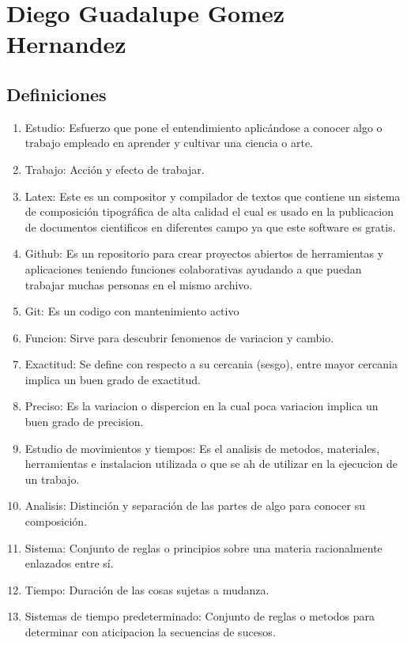 \section{Diego Guadalupe Gomez Hernandez}
\subsection{Definiciones}
\begin{enumerate}
    \item Estudio: Esfuerzo que pone el entendimiento aplicándose a conocer algo o   trabajo empleado en aprender y cultivar una ciencia o arte.
    \item Trabajo: Acción y efecto de trabajar.
    \item Latex: Este es un compositor y compilador de textos que contiene un sistema de composición tipográfica de alta calidad el cual es usado en la publicacion de documentos cientificos en diferentes campo ya que este software es gratis.
    \cite{brys2019tesis}
    \item Github: Es un repositorio  para crear proyectos abiertos de herramientas y aplicaciones teniendo funciones colaborativas ayudando a que puedan trabajar muchas personas en el mismo archivo. 
    \cite{yúbalfernández_2019}
    \item Git: Es un codigo con mantenimiento activo
    \cite{astigarraga2022se}
    \item Funcion: Sirve para descubrir fenomenos de variacion y cambio.
    \item Exactitud: Se define con respecto a su cercania (sesgo), entre mayor cercania implica un buen grado de exactitud.  
    \item Preciso: Es la variacion o dispercion en la cual poca variacion implica un buen grado de precision.
    \item Estudio de movimientos y tiempos: Es el analisis de metodos, materiales, herramientas e instalacion utilizada o que se ah de utilizar en la ejecucion de un trabajo.
    \item Analisis: Distinción y separación de las partes de algo para conocer su composición.
    \cite{RAE2023}
    \item Sistema: Conjunto de reglas o principios sobre una materia racionalmente enlazados entre sí.
    \cite{asale_rae_2023}
    \item Tiempo: Duración de las cosas sujetas a mudanza.
    \item Sistemas de tiempo predeterminado: Conjunto de reglas o metodos para determinar con aticipacion la secuencias de sucesos.

\end{enumerate}

